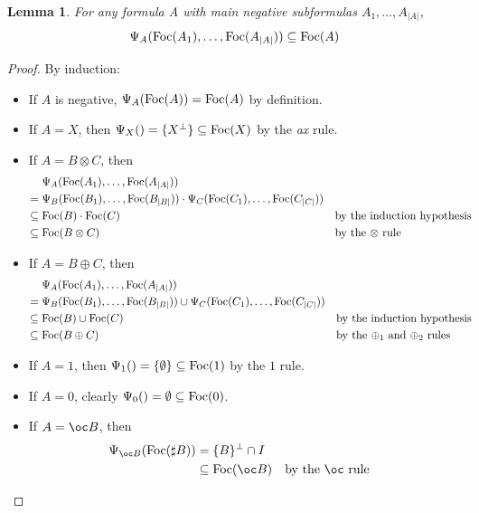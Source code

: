 \documentclass[11pt]{article}
\newtheorem{lemma}[theorem]{Lemma}
\newcommand\0{\textbf{0}}
\newcommand\1{\textbf{1}}
\newcommand\size[1]{{\lvert #1 \rvert}}
\newcommand\Foc[1]{\textup{Foc}(#1)}
\begin{document}
\begin{lemma}
    \label{positive_phase}
    For any formula A with main negative subformulas $A_1, \dots, A_\size{A}$,
    $$\Psi_A(\Foc{A_1}, \dots, \Foc{A_\size{A}}) \subseteq \Foc{A}$$
\end{lemma}
\begin{proof}
    By induction:
    \begin{itemize}
        \item If $A$ is negative, $\Psi_A(\Foc{A}) = \Foc{A}$ by definition.
        \item If $A = X$, then $\Psi_X() = \{X^\perp\} \subseteq \Foc{X}$ by the \textit{ax} rule.
        \item If $A = B \otimes C$, then \begin{align*}
            &\Psi_A(\Foc{A_1}, \dots, \Foc{A_\size{A}}) \\
            =\;& \Psi_B(\Foc{B_1}, \dots, \Foc{B_\size{B}}) \cdot \Psi_C(\Foc{C_1}, \dots, \Foc{C_\size{C}}) \\
            \subseteq\;& \Foc{B} \cdot \Foc{C} &&\text{by the induction hypothesis} \\
            \subseteq\;& \Foc{B \otimes C} &&\text{by the $\otimes$ rule}
        \end{align*}
        \item If $A = B \oplus C$, then \begin{align*}
            &\Psi_A(\Foc{A_1}, \dots, \Foc{A_\size{A}}) \\
            =\;& \Psi_B(\Foc{B_1}, \dots, \Foc{B_\size{B}}) \cup \Psi_C(\Foc{C_1}, \dots, \Foc{C_\size{C}}) \\
            \subseteq\;& \Foc{B} \cup \Foc{C} &&\text{by the induction hypothesis} \\
            \subseteq\;& \Foc{B \oplus C} &&\text{by the $\oplus_1$ and $\oplus_2$ rules}
        \end{align*}
        \item If $A = 1$, then $\Psi_1() = \{\emptyset\} \subseteq \Foc{1}$ by the $1$ rule.
        \item If $A = 0$, clearly $\Psi_0() = \emptyset \subseteq \Foc{0}$.
        \item If $A = \oc B$, then \begin{align*}
            \Psi_{\oc B}(\Foc{\sharp B}) &= \{B\}^\perp \cap I \\
            &\subseteq \Foc{\oc B} &&\text{by the $\oc$ rule}
        \end{align*}
    \end{itemize}
\end{proof}
\end{document}
